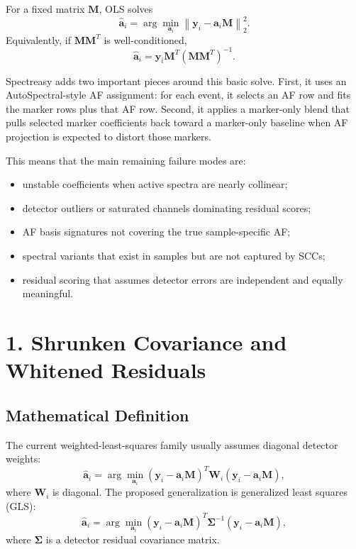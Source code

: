 \documentclass[11pt]{article}
\newcommand{\y}{\mathbf{y}}
\newcommand{\M}{\mathbf{M}}
\newcommand{\aev}{\mathbf{a}}
\newcommand{\W}{\mathbf{W}}
\newcommand{\Sig}{\boldsymbol{\Sigma}}
\begin{document}
For a fixed matrix \(\M\), OLS solves
\begin{equation}
  \hat{\aev}_i
  =
  \arg\min_{\aev_i}
  \left\|
    \y_i - \aev_i \M
  \right\|_2^2.
\end{equation}
Equivalently, if \(\M\M^T\) is well-conditioned,
\begin{equation}
  \hat{\aev}_i
  =
  \y_i \M^T \left(\M\M^T\right)^{-1}.
\end{equation}

Spectreasy adds two important pieces around this basic solve. First, it uses an
AutoSpectral-style AF assignment: for each event, it selects an AF row and fits
the marker rows plus that AF row. Second, it applies a marker-only blend that
pulls selected marker coefficients back toward a marker-only baseline when AF
projection is expected to distort those markers.

This means that the main remaining failure modes are:
\begin{itemize}
  \item unstable coefficients when active spectra are nearly collinear;
  \item detector outliers or saturated channels dominating residual scores;
  \item AF basis signatures not covering the true sample-specific AF;
  \item spectral variants that exist in samples but are not captured by SCCs;
  \item residual scoring that assumes detector errors are independent and equally meaningful.
\end{itemize}

\section{1. Shrunken Covariance and Whitened Residuals}

\subsection*{Mathematical Definition}

The current weighted-least-squares family usually assumes diagonal detector
weights:
\begin{equation}
  \hat{\aev}_i
  =
  \arg\min_{\aev_i}
  \left(\y_i - \aev_i\M\right)^T
  \W_i
  \left(\y_i - \aev_i\M\right),
\end{equation}
where \(\W_i\) is diagonal. The proposed generalization is generalized least
squares (GLS):
\begin{equation}
  \hat{\aev}_i
  =
  \arg\min_{\aev_i}
  \left(\y_i - \aev_i\M\right)^T
  \Sig^{-1}
  \left(\y_i - \aev_i\M\right),
\end{equation}
where \(\Sig\) is a detector residual covariance matrix.
\end{document}
